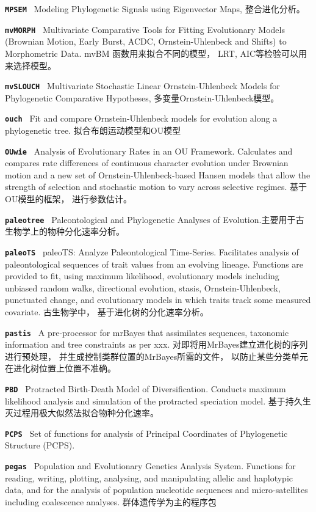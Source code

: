 \documentclass[10pt,landscape]{article}
\newcommand{\bcode}[1]{\texttt{\textbf{#1}}}
\begin{document}
\begin{CJK}{UTF8}{gbsn}
\begin{multicols}{3}
\bcode{MPSEM          } Modeling Phylogenetic Signals using Eigenvector Maps, 整合进化分析。

\bcode{mvMORPH        } Multivariate Comparative Tools for Fitting Evolutionary Models (Brownian Motion, Early Burst, ACDC, Ornstein-Uhlenbeck and Shifts) to Morphometric Data. mvBM 函数用来拟合不同的模型， LRT, AIC等检验可以用来选择模型。 

\bcode{mvSLOUCH       } Multivariate Stochastic Linear Ornstein-Uhlenbeck Models for Phylogenetic Comparative Hypotheses, 多变量Ornstein-Uhlenbeck模型。

\bcode{ouch           } Fit and compare Ornstein-Uhlenbeck models for evolution along a phylogenetic tree. 拟合布朗运动模型和OU模型

\bcode{OUwie          } Analysis of Evolutionary Rates in an OU Framework. Calculates and compares rate differences of continuous character evolution under Brownian motion and a new set of Ornstein-Uhlenbeck-based Hansen models that allow the strength of selection and stochastic motion to vary across selective regimes. 基于OU模型的框架， 进行参数估计。 

\bcode{paleotree      } Paleontological and Phylogenetic Analyses of Evolution.主要用于古生物学上的物种分化速率分析。 

\bcode{paleoTS        } paleoTS: Analyze Paleontological Time-Series. Facilitates analysis of paleontological sequences of trait values from an evolving lineage. Functions are provided to fit, using maximum likelihood, evolutionary models including unbiased random walks, directional evolution, stasis, Ornstein-Uhlenbeck, punctuated change, and evolutionary models in which traits track some measured covariate. 古生物学中， 基于进化树的分化速率分析。

\bcode{pastis         } A pre-processor for mrBayes that assimilates sequences, taxonomic information and tree constraints as per xxx.  对即将用MrBayes建立进化树的序列进行预处理， 并生成控制类群位置的MrBayes所需的文件， 以防止某些分类单元在进化树位置上位置不准确。  

\bcode{PBD            } Protracted Birth-Death Model of Diversification. Conducts maximum likelihood analysis and simulation of the protracted speciation model. 基于持久生灭过程用极大似然法拟合物种分化速率。

\bcode{PCPS           } Set of functions for analysis of Principal Coordinates of Phylogenetic Structure (PCPS). 

\bcode{pegas          } Population and Evolutionary Genetics Analysis System. Functions for reading, writing, plotting, analysing, and manipulating allelic and haplotypic data, and for the analysis of population nucleotide sequences and micro-satellites including coalescence analyses. 群体遗传学为主的程序包


\end{multicols}
\end{CJK}
\end{document}
